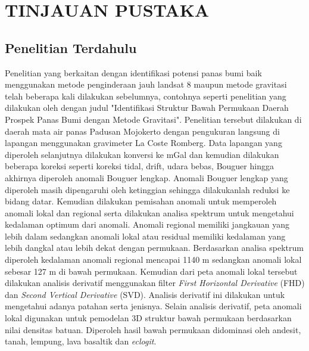 \chapter{TINJAUAN PUSTAKA}
\section{Penelitian Terdahulu}
\hspace{25pt}Penelitian yang berkaitan dengan identifikasi potensi panas bumi baik menggunakan metode penginderaan jauh landsat 8 maupun metode gravitasi telah beberapa kali dilakukan sebelumnya, contohnya seperti penelitian yang dilakukan oleh\citep{Rosyiful2019} dengan judul "Identifikasi Struktur Bawah Permukaan Daerah Prospek Panas Bumi dengan Metode Gravitasi".  Penelitian tersebut dilakukan di daerah mata air panas Padusan Mojokerto dengan pengukuran langsung di lapangan menggunakan gravimeter La Coste Romberg. Data lapangan yang diperoleh selanjutnya dilakukan konversi ke mGal dan kemudian dilakukan beberapa koreksi seperti koreksi tidal, drift, udara bebas, Bouguer hingga akhirnya diperoleh anomali Bouguer lengkap. Anomali Bouguer lengkap yang diperoleh masih dipengaruhi oleh ketinggian sehingga dilakukanlah reduksi ke bidang datar. Kemudian dilakukan pemisahan anomali untuk memperoleh anomali lokal dan regional serta dilakukan analisa spektrum untuk mengetahui kedalaman optimum dari anomali. Anomali regional memiliki jangkauan yang lebih dalam sedangkan anomali lokal atau residual memiliki kedalaman yang lebih dangkal atau lebih dekat dengan permukaan. Berdasarkan analisa spektrum diperoleh kedalaman anomali regional mencapai 1140 m sedangkan anomali lokal sebesar 127 m di bawah permukaan. Kemudian dari peta anomali lokal tersebut dilakukan analisis derivatif menggunakan filter \textit{First Horizontal Derivative} (FHD) dan \textit{Second Vertical Derivative }(SVD). Analisis derivatif ini dilakukan untuk mengetahui adanya patahan serta jenisnya. Selain analisis derivatif, peta anomali lokal digunakan untuk pemodelan 3D struktur bawah permukaan berdasarkan nilai densitas batuan. Diperoleh hasil bawah permukaan didominasi oleh andesit, tanah, lempung, lava basaltik dan \textit{eclogit}.

